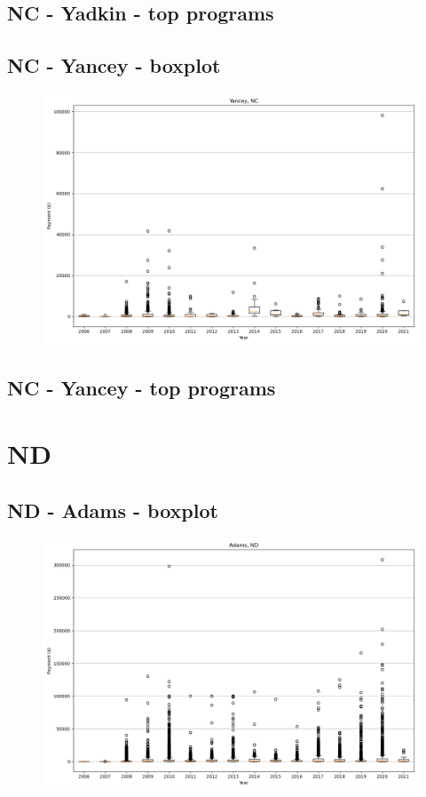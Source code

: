 \subsection*{NC - Yadkin - top programs}

\newpage
\subsection*{NC - Yancey - boxplot}
\begin{figure}[h]
\centering
\includegraphics[width=7in]{../output/boxplots/counties/Yancey-NC_boxplot.png}
\end{figure}


\subsection*{NC - Yancey - top programs}

\newpage
\section*{ND}
\subsection*{ND - Adams - boxplot}
\begin{figure}[h]
\centering
\includegraphics[width=7in]{../output/boxplots/counties/Adams-ND_boxplot.png}
\end{figure}


